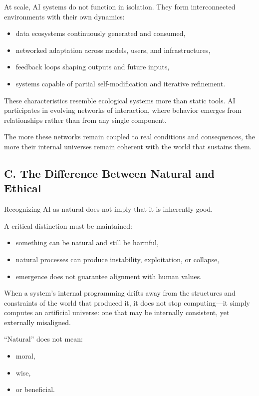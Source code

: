 \documentclass[12pt]{article}
\begin{document}
At scale, AI systems do not function in isolation. They form interconnected environments with their own dynamics:

\begin{itemize}
    \item data ecosystems continuously generated and consumed,
    \item networked adaptation across models, users, and infrastructures,
    \item feedback loops shaping outputs and future inputs,
    \item systems capable of partial self-modification and iterative refinement.
\end{itemize}

These characteristics resemble ecological systems more than static tools. AI participates in evolving networks of interaction, where behavior emerges from relationships rather than from any single component.

The more these networks remain coupled to real conditions and consequences, the more their internal universes remain coherent with the world that sustains them.
\subsection*{C. The Difference Between Natural and Ethical}

Recognizing AI as natural does not imply that it is inherently good.

A critical distinction must be maintained:
\begin{itemize}
    \item something can be natural and still be harmful,
    \item natural processes can produce instability, exploitation, or collapse,
    \item emergence does not guarantee alignment with human values.
\end{itemize}

When a system's internal programming drifts away from the structures and constraints of the world that produced it, it does not stop computing---it simply computes an artificial universe: one that may be internally consistent, yet externally misaligned.

“Natural” does not mean:
\begin{itemize}
    \item moral,
    \item wise,
    \item or beneficial.
\end{itemize}
\end{document}
